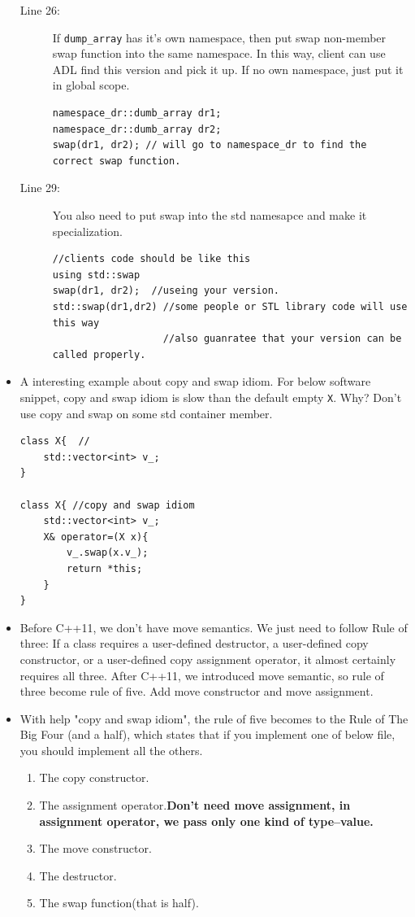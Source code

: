 \documentclass[a4paper,11pt,twoside]{book}
\begin{document}
\begin{itemize}
\begin{description}
    \item[Line 26:] If \texttt{dump\_array} has it's own namespace, then put swap non-member swap function into the same namespace. In this way, client can use ADL find this version and pick it up. If no own namespace, just put it in global scope.
    
\begin{lstlisting}
namespace_dr::dumb_array dr1;
namespace_dr::dumb_array dr2;
swap(dr1, dr2); // will go to namespace_dr to find the correct swap function.
\end{lstlisting}

    \item [Line 29:] You also need to put swap into the std namesapce and make it specialization.
\begin{lstlisting}
//clients code should be like this
using std::swap
swap(dr1, dr2);  //useing your version.
std::swap(dr1,dr2) //some people or STL library code will use this way
                   //also guanratee that your version can be called properly. 
\end{lstlisting}	

\end{description}
	
	\item A interesting example about copy and swap idiom.  For below software snippet, copy and swap idiom is slow than the default empty \texttt{X}. Why? Don't use copy and swap on some std container member. 
\begin{lstlisting}
class X{  //
	std::vector<int> v_;
}

class X{ //copy and swap idiom
	std::vector<int> v_;
	X& operator=(X x){
		v_.swap(x.v_);
		return *this;
	}
}

\end{lstlisting}


	\item Before C++11, we don't have move semantics. We just need to follow Rule of three: If a class requires a user-defined destructor, a user-defined copy constructor, or a user-defined copy assignment operator, it almost certainly requires all three. After C++11, we introduced move semantic, so rule of three become rule of five. Add move constructor and move assignment.
	
	\item With help "copy and swap idiom", the rule of five becomes to the Rule of The Big Four (and a half), which states that if you implement one of below file, you should implement all the others.
	\begin{enumerate}
		\item The copy constructor.
		\item The assignment operator.\textbf{Don't need move assignment, in assignment operator, we pass only one kind of type--value.} 
		\item The move constructor.
		\item The destructor.
		\item The swap function(that is half).
	\end{enumerate}
    	
\end{itemize}
\end{document}
